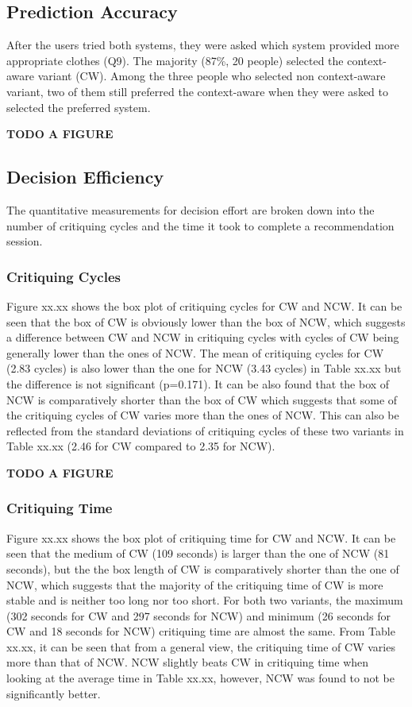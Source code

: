\subsection{Prediction Accuracy} \label{sec:results_pa}

After the users tried both systems, they were asked which system provided more appropriate clothes (Q9). The majority (87\%, 20 people) selected the context-aware variant (CW). Among the three people who selected non context-aware variant, two of them still preferred the context-aware when they were asked to selected the preferred system.

\textbf{TODO A FIGURE}

\subsection{Decision Efficiency} \label{sec:results_de}

The quantitative measurements for decision effort are broken down into the number of critiquing cycles and the time it took to complete a recommendation session.

\subsubsection{Critiquing Cycles} \label{sec:results_de_cc}

Figure xx.xx shows the box plot of critiquing cycles for CW and NCW. It can be seen that the box of CW is obviously lower than the box of NCW, which suggests a difference between CW and NCW in critiquing cycles with cycles of CW being generally lower than the ones of NCW. The mean of critiquing cycles for CW (2.83 cycles) is also lower than the one for NCW (3.43 cycles) in Table xx.xx but the difference is not significant (p=0.171). It can be also found that the box of NCW is comparatively shorter than the box of CW which suggests that some of the critiquing cycles of CW varies more than the ones of NCW. This can also be reflected from the standard deviations of critiquing cycles of these two variants in Table xx.xx (2.46 for CW compared to 2.35 for NCW).

\textbf{TODO A FIGURE}

\subsubsection{Critiquing Time} \label{sec:results_de_ct}

Figure xx.xx shows the box plot of critiquing time for CW and NCW. It can be seen that the medium of CW (109 seconds) is larger than the one of NCW (81 seconds), but the the box length of CW is comparatively shorter than the one of NCW, which suggests that the majority of the critiquing time of CW is more stable and is neither too long nor too short. For both two variants, the maximum (302 seconds for CW and 297 seconds for NCW) and minimum  (26 seconds for CW and 18 seconds for NCW) critiquing time are almost the same. 
From Table xx.xx, it can be seen that from a general view, the critiquing time of CW varies more than that of NCW. NCW slightly beats CW in critiquing time when looking at the average time in Table xx.xx, however, NCW was found to not be significantly better.

